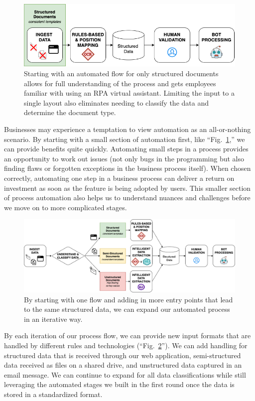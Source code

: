 \documentclass[conference]{IEEEtran}
\begin{document}
\begin{figure}[ht]
\centerline{\includegraphics[width=\columnwidth]{USE CASE - 1 - STRUCTURED.png}}
\caption{Starting with an automated flow for only structured documents allows for full understanding of the process and gets employees familiar with using an RPA virtual assistant. Limiting the input to a single layout also eliminates needing to classify the data and determine the document type.}
\label{figUseCase1}
\end{figure}

Businesses may experience a temptation to view automation as an all-or-nothing scenario. By starting with a small section of automation first, like ``Fig.~\ref{figUseCase1},'' we can provide benefits quite quickly. Automating small steps in a process provides an opportunity to work out issues (not only bugs in the programming but also finding flaws or forgotten exceptions in the business process itself). When chosen correctly, automating one step in a business process can deliver a return on investment as soon as the feature is being adopted by users. This smaller section of process automation also helps us to understand nuances and challenges before we move on to more complicated stages.

\begin{figure}[ht]
\centerline{\includegraphics[width=\columnwidth]{USE CASE - 4 - ALL.png}}
\caption{By starting with one flow and adding in more entry points that lead to the same structured data, we can expand our automated process in an iterative way.}
\label{figUseCase4}
\end{figure}

By each iteration of our process flow, we can provide new input formats that are handled by different rules and technologies (``Fig.~\ref{figUseCase4}''). We can add handling for structured data that is received through our web application, semi-structured data received as files on a shared drive, and unstructured data captured in an email message. We can continue to expand for all data classifications while still leveraging the automated stages we built in the first round once the data is stored in a standardized format.
\end{document}
